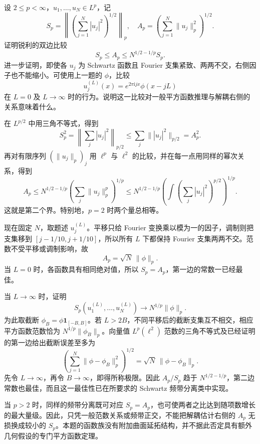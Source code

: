 \begin{optionalexercise}\label{b2:ex:25-new-8}
设 \(2\leq p<\infty\)，\(u_1,\ldots,u_N\in L^p\)，记
\[
 S_p=\left\|\left(\sum_{j=1}^N|u_j|^2\right)^{1/2}\right\|_p,
 \quad A_p=\left(\sum_{j=1}^N\|u_j\|_p^2\right)^{1/2}.
\]
证明锐利的双边比较
\[
 S_p\leq A_p\leq N^{1/2-1/p}S_p.
\]
进一步证明，即使各 \(u_j\) 为 Schwartz 函数且 Fourier 支集紧致、两两不交，右侧因子也不能缩小。可使用上一题的 \(\phi\)，比较
\[
 u_j^{(L)}(x)=e^{2\pi\mathrm i jx}\phi(x-jL)
\]
在 \(L=0\) 及 \(L\to\infty\) 时的行为。说明这一比较对一般平方函数推理与解耦右侧的关系意味着什么。
\end{optionalexercise}
\begin{solution}
在 \(L^{p/2}\) 中用三角不等式，得到
\[
 S_p^2
 =\left\|\sum_j|u_j|^2\right\|_{p/2}
 \leq\sum_j\||u_j|^2\|_{p/2}=A_p^2.
\]
再对有限序列 \((\|u_j\|_p)_j\) 用 \(\ell^p\) 与 \(\ell^2\) 的比较，并在每一点用同样的幂次关系，得到
\[
 A_p
 \leq N^{1/2-1/p}\left(\sum_j\|u_j\|_p^p\right)^{1/p}
 \leq N^{1/2-1/p}
       \left(\int\left(\sum_j|u_j|^2\right)^{p/2}\right)^{1/p}.
\]
这就是第二个界。特别地，\(p=2\) 时两个量总相等。

现在固定 \(N\)，取题述 \(u_j^{(L)}\)。平移只给 Fourier 变换乘以模为一的因子，调制则把支集移到
\([j-1/10,j+1/10]\)，所以所有 \(L\) 下都保持 Fourier 支集两两不交。范数不受平移或调制影响，故
\[
 A_p=\sqrt N\,\|\phi\|_p.
\]
当 \(L=0\) 时，各函数具有相同绝对值，所以 \(S_p=A_p\)，第一边的常数一已经最佳。

当 \(L\to\infty\) 时，证明
\[
 S_p(u_1^{(L)},\ldots,u_N^{(L)})
       \longrightarrow N^{1/p}\|\phi\|_p.
\]
为此取截断 \(\phi_B=\phi\mathbf1_{[-B,B]}\)。若 \(L>2B\)，不同平移后的截断支集互不相交，相应平方函数范数恰为
\(N^{1/p}\|\phi_B\|_p\)。向量值 \(L^p(\ell^2)\) 范数的三角不等式及已经证明的第一边给出截断误差至多为
\[
 \left(\sum_{j=1}^N\|\phi-\phi_B\|_p^2\right)^{1/2}
       =\sqrt N\,\|\phi-\phi_B\|_p.
\]
先令 \(L\to\infty\)，再令 \(B\to\infty\)，即得所称极限。因此 \(A_p/S_p\) 趋于
\(N^{1/2-1/p}\)，第二边常数也最佳，而且这一最佳性已在所要求的 Schwartz 频带分离类中实现。

当 \(p>2\) 时，同样的频带分离既可对应 \(S_p=A_p\)，也可使两者之比达到随项数增长的最大量级。因此，只凭一般范数关系或频带正交，不能把解耦估计右侧的 \(A_p\) 无损换成较小的 \(S_p\)。本题的函数族没有附加曲面延拓结构，并不据此否定具有额外几何假设的专门平方函数定理。
\end{solution}

